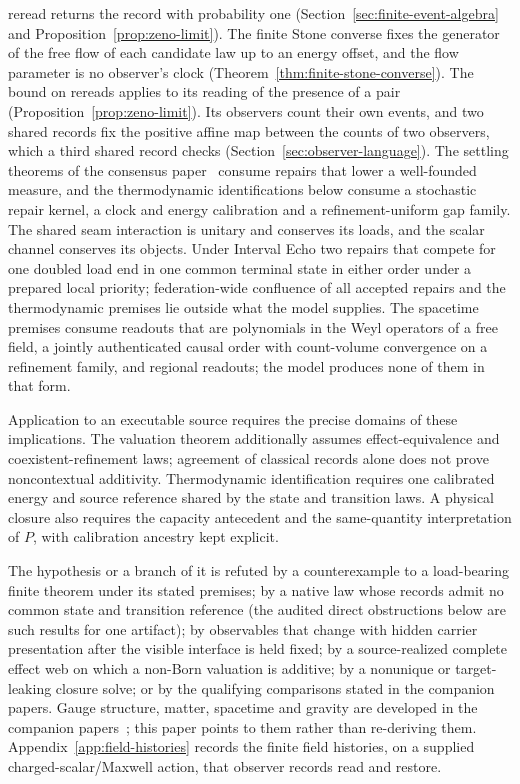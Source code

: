 \documentclass[11pt]{article}
\newcounter{none}
\begin{document}
reread returns the record with probability one
(Section~\ref{sec:finite-event-algebra} and
Proposition~\ref{prop:zeno-limit}). The finite Stone converse fixes the
generator of the free flow of each candidate law up to an energy offset,
and the flow parameter is no observer's clock
(Theorem~\ref{thm:finite-stone-converse}). The bound on
rereads applies to its reading of the presence of a pair
(Proposition~\ref{prop:zeno-limit}). Its observers count their own
events, and two shared records fix the positive affine map between the
counts of two observers, which a third shared record checks
(Section~\ref{sec:observer-language}). The settling theorems of the
consensus paper~\cite{ophconsensus} consume repairs that lower a
well-founded measure, and the thermodynamic identifications below consume a
stochastic repair kernel, a clock and energy calibration and a
refinement-uniform gap family. The shared seam interaction is unitary and
conserves its loads, and the scalar channel conserves its objects. Under
Interval Echo two repairs that compete for one doubled load end in one
common terminal state in either order under a prepared local priority;
federation-wide confluence of all accepted repairs and the thermodynamic
premises lie outside what the model supplies. The spacetime premises
consume readouts that are polynomials in the Weyl operators of a free
field, a jointly authenticated causal order with count-volume convergence
on a refinement family, and regional readouts; the model produces none of
them in that form.

Application to an executable source requires the precise domains of
these implications. The valuation theorem additionally assumes
effect-equivalence and coexistent-refinement laws; agreement of classical
records alone does not prove noncontextual additivity. Thermodynamic
identification requires one calibrated energy and source reference shared
by the state and transition laws. A physical closure also requires the
capacity antecedent and the same-quantity interpretation of \(P\), with
calibration ancestry kept explicit.

The hypothesis or a branch of it is refuted by a counterexample to a
load-bearing finite theorem under its stated premises; by a native law whose
records admit no common state and transition reference (the audited direct
obstructions below are such results for one artifact); by observables that
change with hidden carrier presentation after the visible interface is held
fixed; by a source-realized complete effect web on which a non-Born valuation
is additive; by a nonunique or target-leaking closure solve; or by the
qualifying comparisons stated in the companion papers. Gauge structure,
matter, spacetime and gravity are developed in the companion
papers~\cite{ophGauge,ophparticles,ophEinstein}; this paper points to them
rather than re-deriving them. Appendix~\ref{app:field-histories} records the
finite field histories, on a supplied charged-scalar/Maxwell action, that
observer records read and restore.
\end{document}

